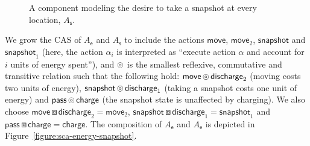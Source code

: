 \documentclass[a4paper]{article}
\newcommand{\composable}{\mathop{\ocircle}\nolimits}
\newcommand{\compose}{\mathop{\boxbox}\nolimits}
\theoremstyle{definition}
\newcommand{\move}{\mathsf{move}}
\newcommand{\snapshot}{\mathsf{snapshot}}
\newcommand{\s}{\mathsf{s}}
\newcommand{\discharge}{\mathsf{discharge}}
\newcommand{\charge}{\mathsf{charge}}
\newcommand{\pass}{\mathsf{pass}}
\newcommand{\e}{\mathsf{e}}
\begin{document}
\begin{figure}
    \centering
    \caption{A component modeling the desire to take a snapshot at every location, $A_\s$.}\label{figure:sca-snapshot}
\end{figure}

We grow the CAS of $A_\e$ and $A_\s$ to include the actions $\move$, $\move_2$, $\snapshot$ and $\snapshot_1$ (here, the action $\alpha_i$ is interpreted as ``execute action $\alpha$ and account for $i$ units of energy spent''), and $\composable$ is the smallest reflexive, commutative and transitive relation such that the following hold: $\move \composable \discharge_2$ (moving costs two units of energy), $\snapshot \composable \discharge_1$ (taking a snapshot costs one unit of energy) and $\pass \composable \charge$ (the snapshot state is unaffected by charging). We also choose $\move \compose \discharge_2 = \move_2$, $\snapshot \compose \discharge_1 = \snapshot_1$ and $\pass \compose \charge = \charge$. The composition of $A_\e$ and $A_\e$ is depicted in Figure~\ref{figure:sca-energy-snapshot}. 
\end{document}
